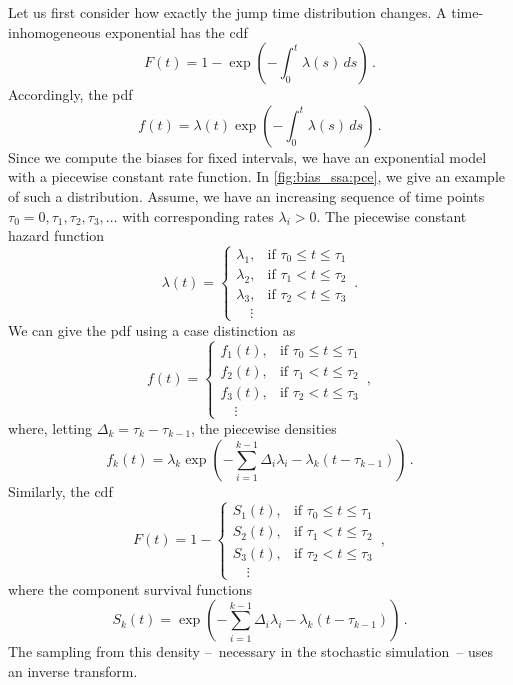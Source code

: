 Let us first consider how exactly the jump time distribution changes.
A time-inhomogeneous exponential has the cdf
\[
    F(t) = 1 - \exp\left(-\int_0^t \lambda(s)\,ds\right)\,.
\]
Accordingly, the pdf
\[
    f(t) = \lambda(t)\exp\left(-\int_0^t \lambda(s)\,ds\right)\,.
\]
Since we compute the biases for fixed intervals, we have an exponential model with a piecewise constant rate function.
In \autoref{fig:bias_ssa:pce}, we give an example of such a distribution.
Assume, we have an increasing sequence of time points $\tau_0=0, \tau_1, \tau_2, \tau_3, \dots$ with corresponding rates $\lambda_i >0$.
The piecewise constant hazard function
\[
    \lambda(t) = \begin{cases}
        \lambda_1, & \text{if } \tau_0 \leq t \leq \tau_1\\
        \lambda_2, & \text{if } \tau_1 < t \leq \tau_2\\
        \lambda_3, & \text{if } \tau_2 < t \leq \tau_3\\
        \quad\vdots
    \end{cases}\,.
\]
We can give the pdf using a case distinction as
\begin{equation}
    f(t) = \begin{cases}
        f_1(t), & \text{if }\tau_0 \leq t \leq \tau_1\\
        f_2(t), & \text{if }\tau_1 < t \leq \tau_2\\
        f_3(t), & \text{if }\tau_2 < t \leq \tau_3\\
        \quad\vdots
    \end{cases}\,,
\end{equation}
where, letting $\Delta_k = \tau_k - \tau_{k-1}$, the piecewise densities
\[
    f_k(t) = \lambda_k \exp \left( -\sum_{i=1}^{k-1}\Delta_i\lambda_i - \lambda_k\left(t - \tau_{k-1}\right)\right)\,.
\]
Similarly, the cdf
\begin{equation}
    F(t) = 1 - \begin{cases}
        S_1(t), & \text{if }\tau_0 \leq t \leq \tau_1\\
        S_2(t), & \text{if }\tau_1 < t \leq \tau_2\\
        S_3(t), & \text{if }\tau_2 < t \leq \tau_3\\
        \quad\vdots
    \end{cases}\,,
\end{equation}
where the component survival functions
\[
    S_k(t) = \exp \left( -\sum_{i=1}^{k-1}\Delta_i\lambda_i - \lambda_k\left(t - \tau_{k-1}\right)\right)\,.
\]
The sampling from this density --~necessary in the stochastic simulation~-- uses an inverse transform.
